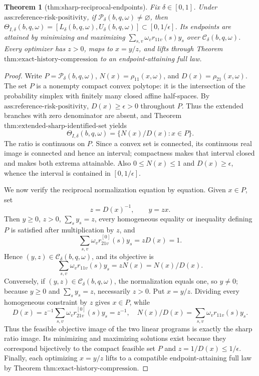 \documentclass{article}
\newtheorem{theorem}{Theorem}
\begin{document}
\begin{theorem}[thm:sharp-reciprocal-endpoints]\label{thm:sharp-reciprocal-endpoints}
Fix \(\delta\in[0,1]\). Under \(\text{ass:reference-risk-positivity}\), if \(\mathcal P_\delta(b,q,\omega)\neq\varnothing\), then \(\Theta_{I,\delta}(b,q,\omega)=[L_\delta(b,q,\omega),U_\delta(b,q,\omega)]\subset[0,1/\epsilon]\). Its endpoints are attained by minimizing and maximizing \(\sum_{s,v}\omega_vr_{11v}(s)y_s\) over \(\mathcal C_\delta(b,q,\omega)\). Every optimizer has \(z>0\), maps to \(x=y/z\), and lifts through Theorem \(\text{thm:exact-history-compression}\) to an endpoint-attaining full law.
\end{theorem}
\begin{proof}
Write \(P=\mathcal P_\delta(b,q,\omega)\), \(N(x)=\rho_{11}(x,\omega)\), and \(D(x)=\rho_{21}(x,\omega)\).  The set \(P\) is a nonempty compact convex polytope: it is the intersection of the probability simplex with finitely many closed affine half-spaces.  By \(\text{ass:reference-risk-positivity}\), \(D(x)\geq\epsilon>0\) throughout \(P\).  Thus the extended branches with zero denominator are absent, and Theorem \(\text{thm:extended-sharp-identified-set}\) yields
\[
\Theta_{I,\delta}(b,q,\omega)=\{N(x)/D(x):x\in P\}.
\]
The ratio is continuous on \(P\).  Since a convex set is connected, its continuous real image is connected and hence an interval; compactness makes that interval closed and makes both extrema attainable.  Also \(0\leq N(x)\leq1\) and \(D(x)\geq\epsilon\), whence the interval is contained in \([0,1/\epsilon]\).

We now verify the reciprocal normalization equation by equation.  Given \(x\in P\), set
\[
z=D(x)^{-1},\qquad y=zx.
\]
Then \(y\geq0\), \(z>0\), \(\sum_sy_s=z\), every homogeneous equality or inequality defining \(P\) is satisfied after multiplication by \(z\), and
\[
\sum_{s,v}\omega_vr^{[0]}_{21v}(s)y_s=zD(x)=1.
\]
Hence \((y,z)\in\mathcal C_\delta(b,q,\omega)\), and its objective is
\[
\sum_{s,v}\omega_vr_{11v}(s)y_s=zN(x)=N(x)/D(x).
\]
Conversely, if \((y,z)\in\mathcal C_\delta(b,q,\omega)\), the normalization equals one, so \(y\ne0\); because \(y\geq0\) and \(\sum_sy_s=z\), necessarily \(z>0\).  Put \(x=y/z\).  Dividing every homogeneous constraint by \(z\) gives \(x\in P\), while
\[
D(x)=z^{-1}\sum_{s,v}\omega_vr^{[0]}_{21v}(s)y_s=z^{-1},
\quad
N(x)/D(x)=\sum_{s,v}\omega_vr_{11v}(s)y_s.
\]
Thus the feasible objective image of the two linear programs is exactly the sharp ratio image.  Its minimizing and maximizing solutions exist because they correspond bijectively to the compact feasible set \(P\) and \(z=1/D(x)\leq1/\epsilon\).  Finally, each optimizing \(x=y/z\) lifts to a compatible endpoint-attaining full law by Theorem \(\text{thm:exact-history-compression}\).
\end{proof}
\end{document}
